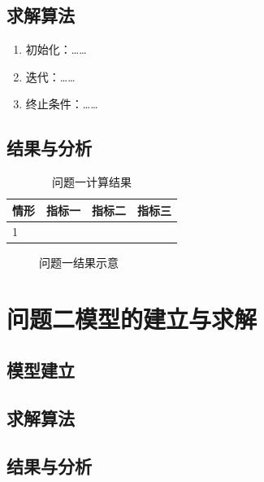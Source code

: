 \documentclass[UTF8,12pt,a4paper,fontset=windows]{ctexart}
\numberwithin{equation}{section}
\begin{document}
\subsection{求解算法}
\begin{enumerate}[label=Step \arabic*.,itemsep=2pt]
  \item 初始化：……
  \item 迭代：……
  \item 终止条件：……
\end{enumerate}

\subsection{结果与分析}
\begin{table}[H]\centering\small
\caption{问题一计算结果}
\begin{tabular}{lccc}
\toprule
情形 & 指标一 & 指标二 & 指标三 \\
\midrule
1 & & & \\
\bottomrule
\end{tabular}
\end{table}

\begin{figure}[H]\centering
\caption{问题一结果示意}
\end{figure}

\section{问题二模型的建立与求解}
\subsection{模型建立}
\subsection{求解算法}
\subsection{结果与分析}
\end{document}
